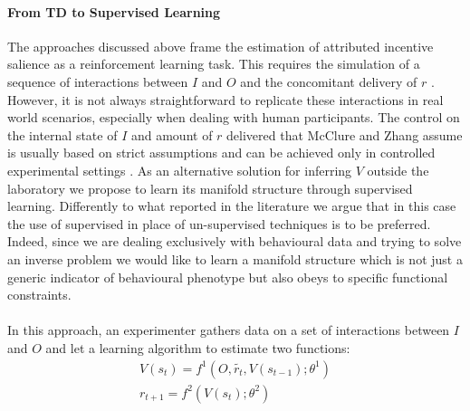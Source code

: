 \paragraph*{\textbf{From TD to Supervised Learning}}
\label{td_to_supervised}The approaches discussed above frame the estimation of attributed incentive salience as a reinforcement learning task. This requires the simulation of a sequence of interactions between $I$ and $O$ and the concomitant delivery of $r$  \cite{schultz1997neural,mcclure2003computational,zhang2009neural}. However, it is not always straightforward to replicate these interactions in real world scenarios, especially when dealing with human participants. The control on the internal state of $I$ and amount of $r$ delivered that McClure and Zhang assume is usually based on strict assumptions and can be achieved only in controlled experimental settings \cite{mcclure2003computational,zhang2009neural}. As an alternative solution for inferring $V$ outside the laboratory we propose to learn its manifold structure through supervised learning. Differently to what reported in the literature \cite{calhoun2019unsupervised, mccullough2021unsupervised, luxem2020identifying, pereira2020quantifying, shi2021learning} we argue that in this case the use of supervised in place of un-supervised techniques is to be preferred. Indeed, since we are dealing exclusively with behavioural data and trying to solve an inverse problem  we would like to learn a manifold structure which is not just a generic indicator of behavioural phenotype \cite{luxem2020identifying} but also obeys to specific functional constraints.\\
\\
In this approach, an experimenter gathers data on a set of interactions between $I$ and $O$ and let a learning algorithm to estimate two functions:
\begin{gather}
\label{supervised_v}
    V(s_{t}) = f^{1}(O, \tilde{r_{t}}, V(s_{t-1}); \theta^{1}) \\
    r_{t+1} = f^{2}(V(s_{t}); \theta^{2}) \nonumber
\end{gather}
